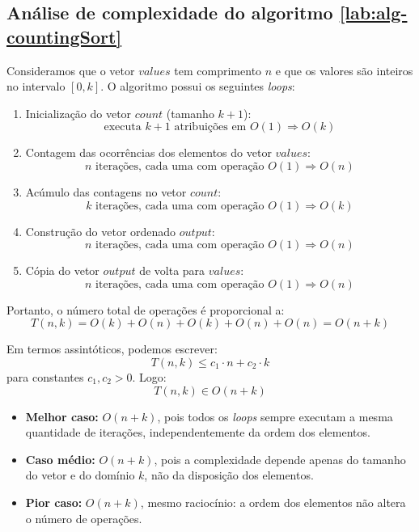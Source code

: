 \subsection{Análise de complexidade do algoritmo \ref{lab:alg-countingSort}}

Consideramos que o vetor $values$ tem comprimento $n$ e que os valores são inteiros no intervalo $[0, k]$. O algoritmo possui os seguintes \textit{loops}:

\begin{enumerate}
    \item Inicialização do vetor $count$ (tamanho $k+1$):
    \[
        \text{executa } k+1 \text{ atribuições em } O(1) \Rightarrow O(k)
    \]
    
    \item Contagem das ocorrências dos elementos do vetor $values$:
    \[
        n \text{ iterações, cada uma com operação } O(1) \Rightarrow O(n)
    \]
    
    \item Acúmulo das contagens no vetor $count$:
    \[
        k \text{ iterações, cada uma com operação } O(1) \Rightarrow O(k)
    \]
    
    \item Construção do vetor ordenado $output$:
    \[
        n \text{ iterações, cada uma com operação } O(1) \Rightarrow O(n)
    \]
    
    \item Cópia do vetor $output$ de volta para $values$:
    \[
        n \text{ iterações, cada uma com operação } O(1) \Rightarrow O(n)
    \]
\end{enumerate}

Portanto, o número total de operações é proporcional a:
\[
T(n, k) = O(k) + O(n) + O(k) + O(n) + O(n) = O(n + k)
\]

\noindent Em termos assintóticos, podemos escrever:
\[
T(n, k) \leq c_1 \cdot n + c_2 \cdot k
\]
para constantes $c_1, c_2 > 0$. Logo:
\[
T(n, k) \in O(n + k)
\]

\begin{itemize}
    \item \textbf{Melhor caso:} $O(n + k)$, pois todos os \textit{loops} sempre executam a mesma quantidade de iterações, independentemente da ordem dos elementos.
    
    \item \textbf{Caso médio:} $O(n + k)$, pois a complexidade depende apenas do tamanho do vetor e do domínio $k$, não da disposição dos elementos.
    
    \item \textbf{Pior caso:} $O(n + k)$, mesmo raciocínio: a ordem dos elementos não altera o número de operações.
\end{itemize}


